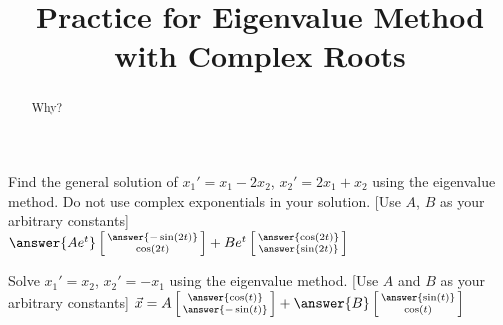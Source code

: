 \documentclass{ximera}
\title{Practice for Eigenvalue Method with Complex Roots}
\begin{document}
\begin{abstract}
Why?
\end{abstract}
\maketitle



\begin{exercise}
    Find the general solution of $x_1' = x_1 -2 x_2$, $x_2' = 2 x_1 + x_2$ using the eigenvalue method. Do not use complex exponentials in your solution. [Use $A$, $B$ as your arbitrary constants] \\
    $\answer{Ae^t}\left[\begin{smallmatrix} \answer{-\sin(2t)}\\ \cos(2t) \end{smallmatrix}\right] + Be^{t}\left[\begin{smallmatrix} \answer{\cos(2t)} \\ \answer{\sin(2t)} \end{smallmatrix}\right]$
\end{exercise}

\begin{exercise}%
    Solve $x_1' = x_2$, $x_2' = -x_1$ using the eigenvalue method. [Use $A$ and $B$ as your arbitrary constants]
    $\vec{x} =
    A \left[ \begin{smallmatrix}
        \answer{\cos(t)} \\ \answer{-\sin(t)}
    \end{smallmatrix}\right]
    + \answer{B}\left[ \begin{smallmatrix}
        \answer{\sin(t)} \\ \cos(t)
    \end{smallmatrix}\right]$
\end{exercise}
\end{document}
